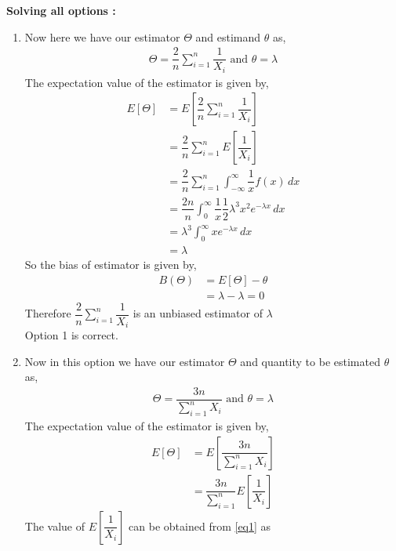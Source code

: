     \textbf{Solving all options : }
    \begin{enumerate}
        \item 
      Now here we have our estimator $ \Theta$ and estimand $ \theta $ as,
     \begin{align}
         \Theta = \dfrac{2}{n} \sum_{i=1}^{n} \dfrac{1}{X_i} \text{  and  }
         \theta = \lambda
     \end{align}
    The expectation value of the estimator is given by, 
    \begin{align}
        E[\Theta ] &= E  \left[   \dfrac{2}{n} \sum_{i=1}^{n} \dfrac{1}{X_i}  \right] \\
        & = \dfrac{2}{n} \sum_{i=1}^{n} E  \left[ \dfrac{1}{X_i}  \right] \\
        & =  \dfrac{2}{n} \sum_{i=1}^{n} \int_{-\infty}^{\infty} \dfrac{1}{x} f(x)\,dx \\
        \label{eq1}
        & = \dfrac{2n}{n} \int_{0}^{\infty} \dfrac{1}{x} \dfrac{1}{2} \lambda^3x^2e^{-\lambda x}\,dx \\
        & = \lambda^3  \int_{0}^{\infty}  x e^{-\lambda x}\,dx \\
        &= \lambda
    \end{align}
    So the bias of estimator is given by,
    \begin{align}
        B(\Theta) &= E[\Theta] - \theta  \\
        &= \lambda - \lambda = 0
    \end{align}
    Therefore $\dfrac{2}{n} \sum_{i=1}^{n} \dfrac{1}{X_i} $ is an unbiased estimator of $ \lambda$ \\
    Option 1 is correct. \\
    \item
     Now in this option we have our estimator $ \Theta$ and quantity to be estimated $ \theta $ as,
     \begin{align}
         \Theta = \dfrac{3n}{\sum_{i=1}^{n} X_i } \text{  and  }
         \theta = \lambda
     \end{align}
    The expectation value of the estimator is given by, 
    \begin{align}
        E[\Theta ] &= E  \left[   \dfrac{3n}{\sum_{i=1}^{n} X_i }  \right] \\
        & = \dfrac{3n}{\sum_{i=1}^{n}}  E  \left[ \dfrac{1}{X_i}  \right] 
    \end{align}
    The value of $  E  \left[ \dfrac{1}{X_i}  \right]  $ can be obtained from \eqref{eq1} as 
    \begin{align} 

\end{align}
\end{enumerate}
